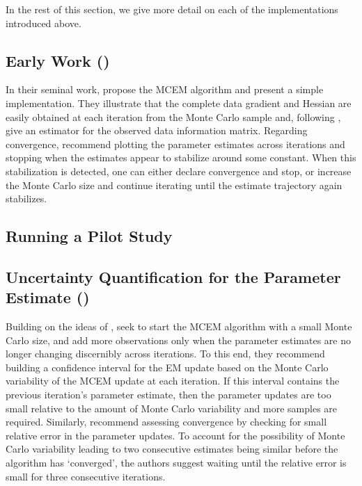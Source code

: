 \documentclass[11pt, oneside]{article}   	%
\begin{document}
In the rest of this section, we give more detail on each of the implementations introduced above.

\subsection{Early Work (\citealp{Wei90})}

In their seminal work, \citet{Wei90} propose the MCEM algorithm and present a simple implementation. They illustrate that the complete data gradient and Hessian are easily obtained at each iteration from the Monte Carlo sample and, following \citet{Lou82}, give an estimator for the observed data information matrix. Regarding convergence, \citeauthor{Wei90} recommend plotting the parameter estimates across iterations and stopping when the estimates appear to stabilize around some constant. When this stabilization is detected, one can either declare convergence and stop, or increase the Monte Carlo size and continue iterating until the estimate trajectory again stabilizes.

\subsection{Running a Pilot Study}



\subsection{Uncertainty Quantification for the Parameter Estimate (\citealp{Boo99})}

Building on the ideas of \citeauthor{Wei90}, \citet{Boo99} seek to start the MCEM algorithm with a small Monte Carlo size, and add more observations only when the parameter estimates are no longer changing discernibly across iterations. To this end, they recommend building a confidence interval for the EM update based on the Monte Carlo variability of the MCEM update at each iteration. If this interval contains the previous iteration's parameter estimate, then the parameter updates are too small relative to the amount of Monte Carlo variability and more samples are required. Similarly, \citeauthor{Boo99} recommend assessing convergence by checking for small relative error in the parameter updates. To account for the possibility of Monte Carlo variability leading to two consecutive estimates being similar before the algorithm has `converged', the authors suggest waiting until the relative error is small for three consecutive iterations.
\end{document}
